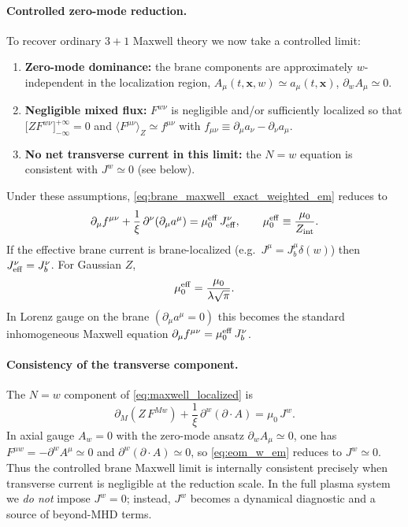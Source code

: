 \documentclass[11pt]{article}
\newcommand{\x}{\mathbf{x}}     %
\newcommand{\A}{A}              %
\newcommand{\F}{F}              %
\newcommand{\J}{J}              %
\newcommand{\Z}{Z}              %
\newcommand{\muzero}{\mu_0}
\newcommand{\muzeff}{\mu_0^{\rm eff}}
\newcommand{\Zint}{Z_{\rm int}}
\begin{document}
\paragraph{Controlled zero-mode reduction.}
To recover ordinary \(3+1\) Maxwell theory we now take a controlled limit:
\begin{enumerate}[leftmargin=1.6em]
\item \textbf{Zero-mode dominance:} the brane components are approximately
\(w\)-independent in the localization region,
\(\A_\mu(t,\x,w)\simeq a_\mu(t,\x)\), \(\partial_w\A_\mu\simeq 0\).
\item \textbf{Negligible mixed flux:} \(\F^{w\nu}\) is negligible and/or sufficiently
localized so that \(\big[\Z\F^{w\nu}\big]_{-\infty}^{+\infty}=0\) and
\(\langle \F^{\mu\nu}\rangle_{\Z}\simeq f^{\mu\nu}\) with
\(f_{\mu\nu}\equiv \partial_\mu a_\nu-\partial_\nu a_\mu\).
\item \textbf{No net transverse current in this limit:} the \(N=w\) equation is
consistent with \(J^w\simeq 0\) (see below).
\end{enumerate}
Under these assumptions, \eqref{eq:brane_maxwell_exact_weighted_em} reduces to
\begin{equation}
\partial_\mu f^{\mu\nu}
+\frac{1}{\xi}\,\partial^\nu(\partial_\mu a^\mu)
=\muzeff\,\J_{\rm eff}^\nu,
\qquad
\muzeff \equiv \frac{\muzero}{\Zint}.
\label{eq:brane_maxwell_gf_em}
\end{equation}
If the effective brane current is brane-localized (e.g.\ \(J^\mu=J_b^\mu\delta(w)\))
then \(\J_{\rm eff}^\nu=\J_b^\nu\). For Gaussian \(\Z\),
\begin{equation}
\muzeff=\frac{\muzero}{\lambda\sqrt{\pi}}.
\label{eq:mu0_eff_em}
\end{equation}
In Lorenz gauge on the brane \((\partial_\mu a^\mu=0)\) this becomes the standard
inhomogeneous Maxwell equation \(\partial_\mu f^{\mu\nu}=\muzeff\,\J_b^\nu\).

\paragraph{Consistency of the transverse component.}
The \(N=w\) component of \eqref{eq:maxwell_localized} is
\begin{equation}
\partial_M\!\left(\Z\,\F^{Mw}\right)+\frac{1}{\xi}\,\partial^w(\partial\!\cdot\!\A)=\muzero\,\J^w.
\label{eq:eom_w_em}
\end{equation}
In axial gauge \(A_w=0\) with the zero-mode ansatz \(\partial_w A_\mu\simeq 0\),
one has \(\F^{\mu w}=-\partial^w A^\mu\simeq 0\) and \(\partial^w(\partial\!\cdot\!A)\simeq 0\),
so \eqref{eq:eom_w_em} reduces to \(\J^w\simeq 0\). Thus the controlled brane Maxwell
limit is internally consistent precisely when transverse current is negligible at
the reduction scale. In the full plasma system we \emph{do not} impose \(\J^w=0\);
instead, \(\J^w\) becomes a dynamical diagnostic and a source of beyond-MHD terms.
\end{document}
